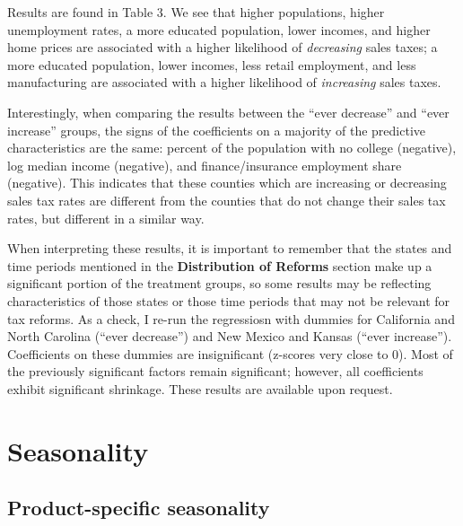 \documentclass[]{article}
\begin{document}
Results are found in Table 3. We see that higher populations, higher
unemployment rates, a more educated population, lower incomes, and
higher home prices are associated with a higher likelihood of
\emph{decreasing} sales taxes; a more educated population, lower
incomes, less retail employment, and less manufacturing are associated
with a higher likelihood of \emph{increasing} sales taxes.

Interestingly, when comparing the results between the ``ever decrease''
and ``ever increase'' groups, the signs of the coefficients on a
majority of the predictive characteristics are the same: percent of the
population with no college (negative), log median income (negative), and
finance/insurance employment share (negative). This indicates that these
counties which are increasing or decreasing sales tax rates are
different from the counties that do not change their sales tax rates,
but different in a similar way.

When interpreting these results, it is important to remember that the
states and time periods mentioned in the \textbf{Distribution of
Reforms} section make up a significant portion of the treatment groups,
so some results may be reflecting characteristics of those states or
those time periods that may not be relevant for tax reforms. As a check,
I re-run the regressiosn with dummies for California and North Carolina
(``ever decrease'') and New Mexico and Kansas (``ever increase'').
Coefficients on these dummies are insignificant (z-scores very close to
0). Most of the previously significant factors remain significant;
however, all coefficients exhibit significant shrinkage. These results
are available upon request.

\section{Seasonality}\label{seasonality}

\subsection{Product-specific
seasonality}\label{product-specific-seasonality}
\end{document}
